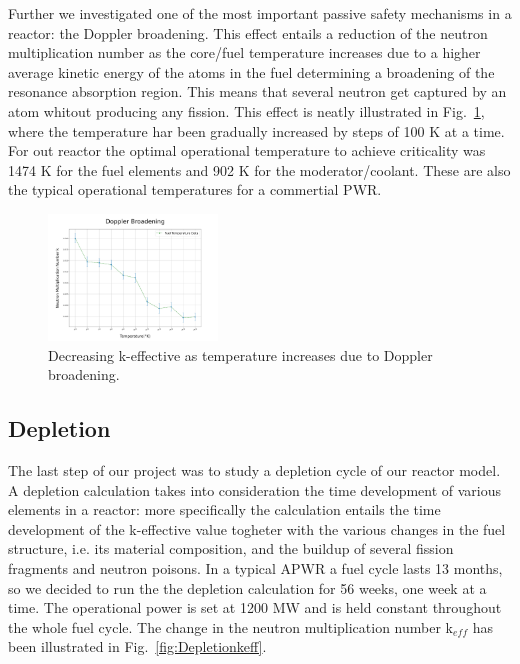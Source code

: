\documentclass[twocolumn,a4paper,10pt]{article}
\begin{document}
\par
Further we investigated one of the most important passive safety mechanisms in a reactor: the Doppler broadening. This effect entails a reduction of the neutron multiplication number as the core/fuel temperature increases due to a higher average kinetic energy of the atoms in the fuel determining a broadening of the resonance absorption region. This means that several neutron get captured by an atom whitout producing any fission. This effect is neatly illustrated in Fig.~\ref{fig:doppler}, where the temperature har been gradually increased by steps of 100 K at a time. For out reactor the optimal operational temperature to achieve criticality was 1474 K for the fuel elements and 902 K for the moderator/coolant. These are also the typical operational temperatures for a commertial PWR.

\begin{figure}[ht]
  \centering
  \includegraphics[width=0.4\textwidth]{../Pictures/Doppler.png}
  \caption{Decreasing k-effective as temperature increases due to Doppler broadening.}
  \label{fig:doppler}
\end{figure}

\subsection[Depletion]{\centering Depletion}
\label{subsec:Depletion}

The last step of our project was to study a depletion cycle of our reactor model. A depletion calculation takes into consideration the time development of various elements in a reactor: more specifically the calculation entails the time development of the k-effective value togheter with the various changes in the fuel structure, i.e. its material composition, and the buildup of several fission fragments and neutron poisons. In a typical APWR a fuel cycle lasts 13 months, so we decided to run the the depletion calculation for 56 weeks, one week at a time. The operational power is set at 1200 MW and is held constant throughout the whole fuel cycle. The change in the neutron multiplication number k$_{eff}$ has been illustrated in Fig.~\ref{fig:Depletionkeff}.
\end{document}
